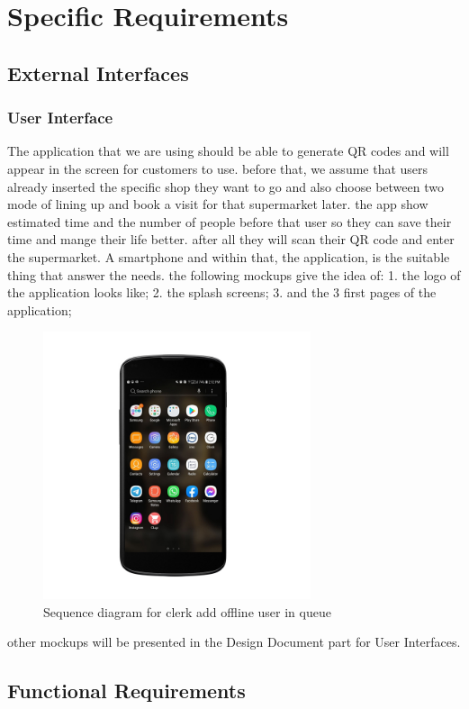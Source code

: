 \section{Specific Requirements}

\subsection{External Interfaces}
\subsubsection{User Interface}
% 
The application that we are using should be able to generate QR codes and will appear in the screen for customers to use. before that, we assume that users already inserted the specific shop they want to go and also choose between two mode of lining up and book a visit for that supermarket later. the app show  estimated time and the number of people before that user so they can save their time and  mange their life better. after all they will scan their QR code and enter the supermarket.
A smartphone and within that, the application, is the suitable thing that answer the needs.
the following mockups give the idea of:
1. the logo of the application looks like;
2. the splash screens;
3. and the 3 first pages of the application;
\begin{figure}[H]
  \centering
  \includegraphics[width=0.7\textwidth,keepaspectratio]{images/1.jpg
}
  \caption{Sequence diagram for clerk add offline user in queue}
\end{figure}
other mockups will be presented in the Design Document part for User Interfaces.
\subsection{Functional Requirements}



